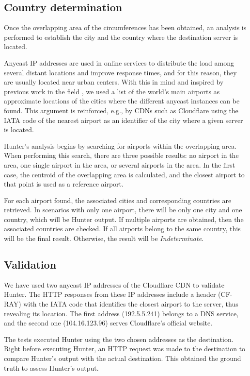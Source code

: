 \documentclass[preprint,12pt]{elsarticle}
\begin{document}
\subsection{Country determination}
Once the overlapping area of the circumferences has been obtained, an analysis is performed to establish the city and the country where the destination server is located. 

Anycast IP addresses are used in online services to distribute the load among several distant locations and improve response times, and for this reason, they are usually located near urban centers. With this in mind and inspired by previous work in the field \cite{Cicalese2016Latency-BasedSets}, we used a list of the world's main airports as approximate locations of the cities where the different anycast instances can be found. This argument is reinforced, e.g., by CDNs such as Cloudflare using the IATA code of the nearest airport as an identifier of the city where a given server is located.

Hunter's analysis begins by searching for airports within the overlapping area. When performing this search, there are three possible results: no airport in the area, one single airport in the area, or several airports in the area. In the first case, the centroid of the overlapping area is calculated, and the closest airport to that point is used as a reference airport.

For each airport found, the associated cities and corresponding countries are retrieved. In scenarios with only one airport, there will be only one city and one country, which will be Hunter output. If multiple airports are obtained, then the associated countries are checked. If all airports belong to the same country, this will be the final result. Otherwise, the result will be \textit{Indeterminate}.

\subsection{Validation}
We have used two anycast IP addresses of the Cloudflare CDN to validate Hunter. The HTTP responses from these IP addresses include a header (CF-RAY)  with the IATA code that identifies the closest airport to the server, thus revealing its location. The first address (192.5.5.241) belongs to a DNS service, and the second one (104.16.123.96) serves Cloudflare's official website.

The tests executed Hunter using the two chosen addresses as the destination. Right before executing Hunter, an HTTP request was made to the destination to compare Hunter's output with the actual destination. This obtained the ground truth to assess Hunter's output.
\end{document}
